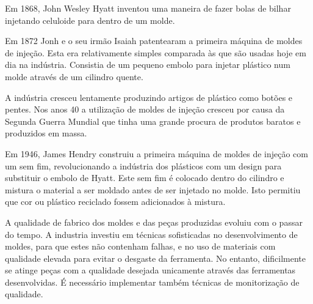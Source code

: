 \documentclass[11pt,twoside,a4paper]{report}
\begin{document}
Em 1868, John Wesley Hyatt inventou uma maneira de fazer bolas de bilhar injetando celuloide para dentro de um molde\cite{historia,patente1868}.\par
Em 1872 Jonh e o seu irmão Isaiah patentearam a primeira máquina de moldes de injeção. Esta era relativamente simples comparada às que são usadas hoje em dia na indústria. Consistia de um pequeno embolo para injetar plástico num molde através de um cilindro quente\cite{historia,patente1872}.\par
A indústria cresceu lentamente produzindo artigos de plástico como botões e pentes. Nos anos 40 a utilização de moldes de injeção cresceu por causa da Segunda Guerra Mundial que tinha uma grande procura de produtos baratos e produzidos em massa\cite{historia}.\par
Em 1946, James Hendry construiu a primeira máquina de moldes de injeção com um sem fim, revolucionando a indústria dos plásticos com um design para substituir o embolo de Hyatt. Este sem fim é colocado dentro do cilindro e mistura o material a ser moldado antes de ser injetado no molde. Isto permitiu que cor ou plástico reciclado fossem adicionados à mistura\cite{historia,patente1946}.\par
A qualidade de fabrico dos moldes e das peças produzidas evoluiu com o passar do tempo. A industria investiu em técnicas sofisticadas no desenvolvimento de moldes, para que estes não contenham falhas, e no uso de materiais com qualidade elevada para evitar o desgaste da ferramenta. No entanto, dificilmente se atinge peças com a qualidade desejada unicamente através das ferramentas desenvolvidas. É necessário implementar também técnicas de monitorização de qualidade\cite{Woll}.
\end{document}
